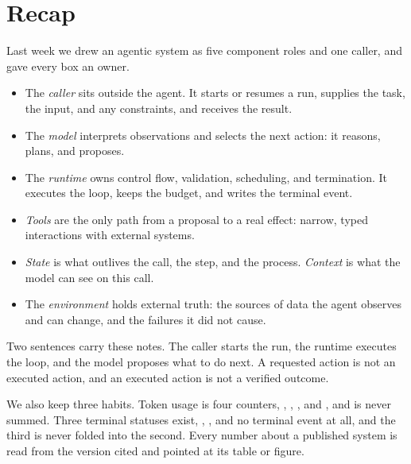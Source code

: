 \section*{Recap}

Last week we drew an agentic system as five component roles and one caller, and gave every box
an owner.
\begin{itemize}
  \item The \emph{caller} sits outside the agent. It starts or resumes a run, supplies the task,
  the input, and any constraints, and receives the result.
  \item The \emph{model} interprets observations and selects the next action: it reasons, plans,
  and proposes.
  \item The \emph{runtime} owns control flow, validation, scheduling, and termination. It
  executes the loop, keeps the budget, and writes the terminal event.
  \item \emph{Tools} are the only path from a proposal to a real effect: narrow, typed
  interactions with external systems.
  \item \emph{State} is what outlives the call, the step, and the process. \emph{Context} is
  what the model can see on this call.
  \item The \emph{environment} holds external truth: the sources of data the agent observes and
  can change, and the failures it did not cause.
\end{itemize}
Two sentences carry these notes. The caller starts the run, the runtime executes the loop, and
the model proposes what to do next. A requested action is not an executed action, and an
executed action is not a verified outcome.

We also keep three habits. Token usage is four counters, , ,
, and , and is never summed. Three terminal statuses
exist, , , and no terminal event at all, and the third is never folded
into the second. Every number about a published system is read from the version cited and
pointed at its table or figure.
